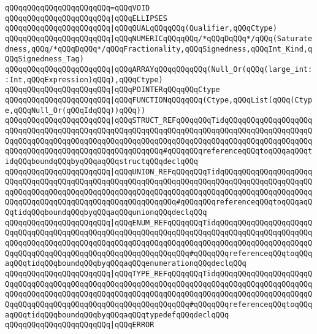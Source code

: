 \verb|qQQqqQQqqQQqqQQqqQQqqQQq=qQQqVOID|\newline
\verb|qQQqqQQqqQQqqQQqqQQqqQQq|\verb#|qQQqELLIPSES#\newline
\verb|qQQqqQQqqQQqqQQqqQQqqQQq|\verb#|qQQqQUALqQQqqQQq(Qualifier,qQQqCtype)#\newline
\verb|qQQqqQQqqQQqqQQqqQQqqQQq|\verb#|qQQqNUMERICqQQqqQQq/*qQQqDqQQq*/qQQq(Saturatedness,qQQq/*qQQqDqQQq*/qQQqFractionality,qQQqSignedness,qQQqInt_Kind,qQQqSignedness_Tag)#\newline
\verb|qQQqqQQqqQQqqQQqqQQqqQQq|\verb#|qQQqARRAYqQQqqQQqqQQq(Null_Or(qQQq(large_int::Int,qQQqExpression)qQQq),qQQqCtype)#\newline
\verb|qQQqqQQqqQQqqQQqqQQqqQQq|\verb#|qQQqPOINTERqQQqqQQqCtype#\newline
\verb|qQQqqQQqqQQqqQQqqQQqqQQq|\verb#|qQQqFUNCTIONqQQqqQQq(Ctype,qQQqList(qQQq(Ctype,qQQqNull_Or(qQQqIdqQQq))qQQq))#\newline
\verb|qQQqqQQqqQQqqQQqqQQqqQQq|\verb#|qQQqSTRUCT_REFqQQqqQQqTidqQQqqQQqqQQqqQQqqQQqqQQqqQQqqQQqqQQqqQQqqQQqqQQqqQQqqQQqqQQqqQQqqQQqqQQqqQQqqQQqqQQqqQQqqQQqqQQqqQQqqQQqqQQqqQQqqQQqqQQqqQQqqQQqqQQqqQQqqQQqqQQqqQQqqQQqqQQqqQQqqQQqqQQqqQQqqQQqqQQqqQQqqQQqqQQqqQQq#\verb|#qQQqqQQqreferenceqQQqtoqQQqaqQQqtidqQQqboundqQQqbyqQQqaqQQqstructqQQqdeclqQQq|\newline
\verb|qQQqqQQqqQQqqQQqqQQqqQQq|\verb#|qQQqUNION_REFqQQqqQQqTidqQQqqQQqqQQqqQQqqQQqqQQqqQQqqQQqqQQqqQQqqQQqqQQqqQQqqQQqqQQqqQQqqQQqqQQqqQQqqQQqqQQqqQQqqQQqqQQqqQQqqQQqqQQqqQQqqQQqqQQqqQQqqQQqqQQqqQQqqQQqqQQqqQQqqQQqqQQqqQQqqQQqqQQqqQQqqQQqqQQqqQQqqQQqqQQqqQQqqQQq#\verb|#qQQqqQQqreferenceqQQqtoqQQqaqQQqtidqQQqboundqQQqbyqQQqaqQQqunionqQQqdeclqQQq|\newline
\verb|qQQqqQQqqQQqqQQqqQQqqQQq|\verb#|qQQqENUM_REFqQQqqQQqTidqQQqqQQqqQQqqQQqqQQqqQQqqQQqqQQqqQQqqQQqqQQqqQQqqQQqqQQqqQQqqQQqqQQqqQQqqQQqqQQqqQQqqQQqqQQqqQQqqQQqqQQqqQQqqQQqqQQqqQQqqQQqqQQqqQQqqQQqqQQqqQQqqQQqqQQqqQQqqQQqqQQqqQQqqQQqqQQqqQQqqQQqqQQqqQQqqQQqqQQqqQQq#\verb|#qQQqqQQqreferenceqQQqtoqQQqaqQQqtidqQQqboundqQQqbyqQQqaqQQqenumerationqQQqdeclqQQq|\newline
\verb|qQQqqQQqqQQqqQQqqQQqqQQq|\verb#|qQQqTYPE_REFqQQqqQQqTidqQQqqQQqqQQqqQQqqQQqqQQqqQQqqQQqqQQqqQQqqQQqqQQqqQQqqQQqqQQqqQQqqQQqqQQqqQQqqQQqqQQqqQQqqQQqqQQqqQQqqQQqqQQqqQQqqQQqqQQqqQQqqQQqqQQqqQQqqQQqqQQqqQQqqQQqqQQqqQQqqQQqqQQqqQQqqQQqqQQqqQQqqQQqqQQqqQQqqQQqqQQq#\verb|#qQQqqQQqreferenceqQQqtoqQQqaqQQqtidqQQqboundqQQqbyqQQqaqQQqtypedefqQQqdeclqQQq|\newline
\verb|qQQqqQQqqQQqqQQqqQQqqQQq|\verb#|qQQqERROR#\newline
